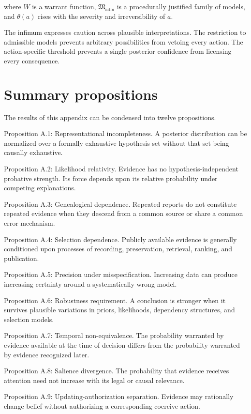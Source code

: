 where \(W\) is a warrant function, \(\mathfrak M_{\mathrm{adm}}\) is a procedurally justified family of models, and \(\theta(a)\) rises with the severity and irreversibility of \(a\).

The infimum expresses caution across plausible interpretations. The restriction to admissible models prevents arbitrary possibilities from vetoing every action. The action-specific threshold prevents a single posterior confidence from licensing every consequence.

\section{Summary propositions}
\label{sec:a65}

The results of this appendix can be condensed into twelve propositions.

Proposition A.1: Representational incompleteness. A posterior distribution can be normalized over a formally exhaustive hypothesis set without that set being causally exhaustive.

Proposition A.2: Likelihood relativity. Evidence has no hypothesis-independent probative strength. Its force depends upon its relative probability under competing explanations.

Proposition A.3: Genealogical dependence. Repeated reports do not constitute repeated evidence when they descend from a common source or share a common error mechanism.

Proposition A.4: Selection dependence. Publicly available evidence is generally conditioned upon processes of recording, preservation, retrieval, ranking, and publication.

Proposition A.5: Precision under misspecification. Increasing data can produce increasing certainty around a systematically wrong model.

Proposition A.6: Robustness requirement. A conclusion is stronger when it survives plausible variations in priors, likelihoods, dependency structures, and selection models.

Proposition A.7: Temporal non-equivalence. The probability warranted by evidence available at the time of decision differs from the probability warranted by evidence recognized later.

Proposition A.8: Salience divergence. The probability that evidence receives attention need not increase with its legal or causal relevance.

Proposition A.9: Updating-authorization separation. Evidence may rationally change belief without authorizing a corresponding coercive action.

